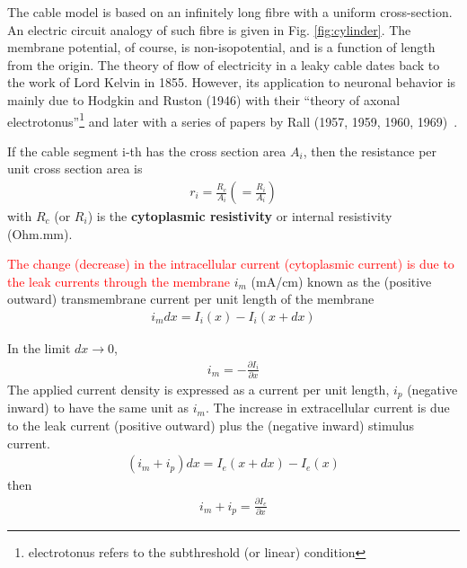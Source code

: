 The cable model is based on an infinitely long fibre with a uniform
cross-section. An electric circuit analogy of such fibre is given in Fig.
\ref{fig:cylinder}. The membrane potential, of course, is non-isopotential, and
is a function of length from the origin. The theory of flow of electricity in a
leaky cable dates back to the work of Lord Kelvin in 1855. However, its
application to neuronal behavior is mainly due to Hodgkin and Ruston
(1946)\citep{hodgkin1946ecc} with their ``theory of axonal
electrotonus''\footnote{electrotonus refers to the subthreshold (or
  linear) condition}
and later with a series of papers by Rall (1957, 1959, 1960,
1969)~\citep{segev1994fdf}.







If the cable segment i-th has the cross section area $A_i$, then the
resistance per unit cross section area is
\begin{eqnarray}
  \label{eq:423}
  r_i = \frac{R_c}{A_i} \left( = \frac{R_i}{A_i} \right)
\end{eqnarray}
with $R_c$ (or $R_i$) is the {\bf cytoplasmic resistivity} or internal
resistivity (Ohm.mm).

\textcolor{red}{The change (decrease) in the intracellular current (cytoplasmic
current) is due to the leak currents through the membrane} $i_m$ (mA/cm) known
as the (positive outward) transmembrane current per unit length of the membrane 
\begin{eqnarray}
  \label{eq:424}
 i_m dx =  I_i(x) - I_i(x+dx) 
\end{eqnarray}


In the limit  $dx\rightarrow 0$, 
\begin{eqnarray}
  \label{eq:426}
  i_m = - \frac{\partial I_i}{\partial x}
\end{eqnarray}
The applied current density is expressed as a current per unit length,
$i_p$ (negative inward) to have the same unit as $i_m$. %
The increase in extracellular current is due to the leak current
(positive outward) plus the (negative inward) stimulus current.
\begin{eqnarray}
  \label{eq:495}
  (i_m + i_p)dx = I_e(x+dx) - I_e(x)
\end{eqnarray}
then
\begin{eqnarray}
  \label{eq:496}
  i_m+i_p = \frac{\partial I_e}{\partial x}
\end{eqnarray}

